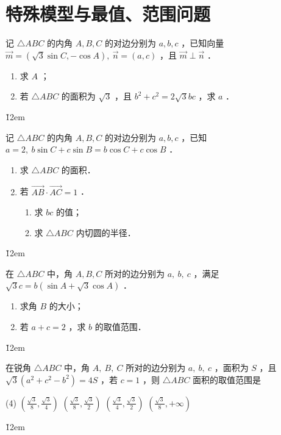 \section{特殊模型与最值、范围问题}

\begin{example}
    记 $\triangle A B C$ 的内角 $A, B, C$ 的对边分别为 $a, b, c$ ，已知向量 $\overrightarrow{m}=(\sqrt{3} \sin C,-\cos A), ~ \overrightarrow{n}=(a, c)$ ，且 $\overrightarrow{m} \perp \overrightarrow{n}$ ．
    \begin{enumerate}
        \item 求 $A$ ；
        \item 若 $\triangle A B C$ 的面积为 $\sqrt{3}$ ，且 $b^2+c^2=2 \sqrt{3} b c$ ，求 $a$ ．
    \end{enumerate}
\end{example}
\v{12em}

\begin{example}
    记 $\triangle A B C$ 的内角 $A, B, C$ 的对边分别为 $a, b, c$ ，已知 $a=2, ~ b \sin C+c \sin B=b \cos C+c \cos B$ ．
    \begin{enumerate}
        \item 求 $\triangle A B C$ 的面积．
        \item 若 $\overrightarrow{A B} \cdot \overrightarrow{A C}=1$ ．
              \begin{enumerate}
                  \item 求 $b c$ 的值；
                  \item 求 $\triangle A B C$ 内切圆的半径．
              \end{enumerate}
    \end{enumerate}
\end{example}
\v{12em}

\begin{example}
    在 $\triangle A B C$ 中，角 $A, B, C$ 所对的边分别为 $a, ~ b, ~ c$ ，满足 $\sqrt{3} c=b(\sin A+\sqrt{3} \cos A)$ ．
    \begin{enumerate}
        \item 求角 $B$ 的大小；
        \item 若 $a+c=2$ ，求 $b$ 的取值范围．
    \end{enumerate}
\end{example}
\v{12em}


\begin{example}
    在锐角 $\triangle A B C$ 中，角 $A, ~ B, ~ C$ 所对的边分别为 $a, ~ b, ~ c$ ，面积为 $S$ ，且 $\sqrt{3}\left(a^2+c^2-b^2\right)=4 S$ ，若 $c=1$ ，则 $\triangle A B C$ 面积的取值范围是
    \begin{tasks}(4)
        \task $\left(\frac{\sqrt{3}}{8}, \frac{\sqrt{3}}{4}\right)$
        \task $\left(\frac{\sqrt{3}}{8}, \frac{\sqrt{3}}{2}\right)$
        \task $\left(\frac{\sqrt{3}}{4}, \frac{\sqrt{3}}{2}\right)$
        \task $\left(\frac{\sqrt{3}}{8},+\infty\right)$
    \end{tasks}
\end{example}
\v{12em}

